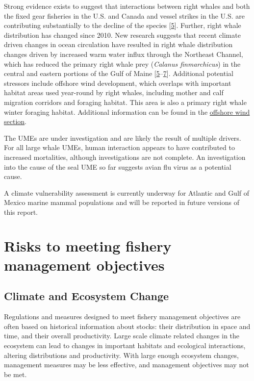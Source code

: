 \documentclass[
  10pt,
]{article}
\begin{document}
Strong evidence exists to suggest that interactions between right whales and both the fixed gear fisheries in the U.S. and Canada and vessel strikes in the U.S. are contributing substantially to the decline of the species {[}\protect\hyperlink{ref-hayes_north_2018}{5}{]}. Further, right whale distribution has changed since 2010. New research suggests that recent climate driven changes in ocean circulation have resulted in right whale distribution changes driven by increased warm water influx through the Northeast Channel, which has reduced the primary right whale prey (\emph{Calanus finmarchicus}) in the central and eastern portions of the Gulf of Maine {[}\protect\hyperlink{ref-hayes_north_2018}{5}--\protect\hyperlink{ref-sorochan_north_2019}{7}{]}. Additional potential stressors include offshore wind development, which overlaps with important habitat areas used year-round by right whales, including mother and calf migration corridors and foraging habitat. This area is also a primary right whale winter foraging habitat. Additional information can be found in the \protect\hyperlink{other-ocean-uses:-offshore-wind}{offshore wind section}.

The UMEs are under investigation and are likely the result of multiple drivers. For all large whale UMEs, human interaction appears to have contributed to increased mortalities, although investigations are not complete. An investigation into the cause of the seal UME so far suggests avian flu virus as a potential cause.

A climate vulnerability assessment is currently underway for Atlantic and Gulf of Mexico marine mammal populations and will be reported in future versions of this report.

\newpage

\hypertarget{risks-to-meeting-fishery-management-objectives}{%
\section{Risks to meeting fishery management objectives}\label{risks-to-meeting-fishery-management-objectives}}

\hypertarget{climate-and-ecosystem-change}{%
\subsection{Climate and Ecosystem Change}\label{climate-and-ecosystem-change}}

Regulations and measures designed to meet fishery management objectives are often based on historical information about stocks: their distribution in space and time, and their overall productivity. Large scale climate related changes in the ecosystem can lead to changes in important habitats and ecological interactions, altering distributions and productivity. With large enough ecosystem changes, management measures may be less effective, and management objectives may not be met.
\end{document}
